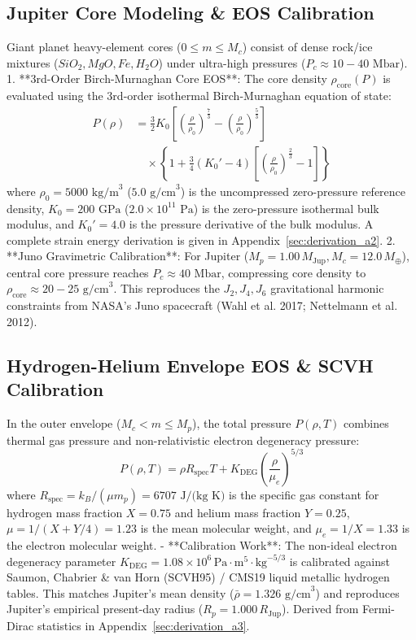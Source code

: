\subsection{Jupiter Core Modeling \& EOS Calibration}
Giant planet heavy-element cores ($0 \le m \le M_c$) consist of dense rock/ice mixtures ($SiO_2, MgO, Fe, H_2O$) under ultra-high pressures ($P_c \approx 10 - 40\text{ Mbar}$).
1. **3rd-Order Birch-Murnaghan Core EOS**:
   The core density $\rho_{\text{core}}(P)$ is evaluated using the 3rd-order isothermal Birch-Murnaghan equation of state:
   \begin{align}
   P(\rho) &= \frac{3}{2} K_0 \left[ \left(\frac{\rho}{\rho_0}\right)^{\frac{7}{3}} - \left(\frac{\rho}{\rho_0}\right)^{\frac{5}{3}} \right] \nonumber \\
   &\quad \times \left\{ 1 + \frac{3}{4} (K_0' - 4) \left[ \left(\frac{\rho}{\rho_0}\right)^{\frac{2}{3}} - 1 \right] \right\}
   \end{align}
   where $\rho_0 = 5000\text{ kg/m}^3$ ($5.0\text{ g/cm}^3$) is the uncompressed zero-pressure reference density, $K_0 = 200\text{ GPa}$ ($2.0 \times 10^{11}\text{ Pa}$) is the zero-pressure isothermal bulk modulus, and $K_0' = 4.0$ is the pressure derivative of the bulk modulus. A complete strain energy derivation is given in Appendix~\ref{sec:derivation_a2}.
2. **Juno Gravimetric Calibration**:
   For Jupiter ($M_p = 1.00\,M_{\mathrm{Jup}}, M_c = 12.0\,M_\oplus$), central core pressure reaches $P_c \approx 40\text{ Mbar}$, compressing core density to $\rho_{\text{core}} \approx 20 - 25\text{ g/cm}^3$. This reproduces the $J_2, J_4, J_6$ gravitational harmonic constraints from NASA's Juno spacecraft (Wahl et al. 2017; Nettelmann et al. 2012).

\subsection{Hydrogen-Helium Envelope EOS \& SCVH Calibration}
In the outer envelope ($M_c < m \le M_p$), the total pressure $P(\rho, T)$ combines thermal gas pressure and non-relativistic electron degeneracy pressure:
\begin{equation}
P(\rho, T) = \rho R_{\mathrm{spec}} T + K_{\mathrm{DEG}} \left(\frac{\rho}{\mu_e}\right)^{5/3}
\end{equation}
where $R_{\mathrm{spec}} = k_B / (\mu m_p) = 6707\text{ J/(kg K)}$ is the specific gas constant for hydrogen mass fraction $X=0.75$ and helium mass fraction $Y=0.25$, $\mu = 1 / (X + Y/4) = 1.23$ is the mean molecular weight, and $\mu_e = 1 / X = 1.33$ is the electron molecular weight.
- **Calibration Work**: The non-ideal electron degeneracy parameter $K_{\mathrm{DEG}} = 1.08 \times 10^6 \, \text{Pa}\cdot\text{m}^5\cdot\text{kg}^{-5/3}$ is calibrated against Saumon, Chabrier \& van Horn (SCVH95) / CMS19 liquid metallic hydrogen tables. This matches Jupiter's mean density ($\bar{\rho} = 1.326\text{ g/cm}^3$) and reproduces Jupiter's empirical present-day radius ($R_p = 1.000\,R_{\mathrm{Jup}}$). Derived from Fermi-Dirac statistics in Appendix~\ref{sec:derivation_a3}.

